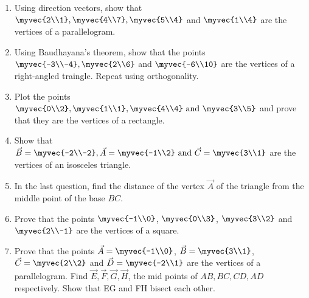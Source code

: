 \begin{enumerate}[label=\arabic*.,ref=\thesubsection.\theenumi]
\item Using direction vectors, show that  $\myvec{2\\1}, \myvec{4\\7}, \myvec{5\\4}$ and $\myvec{1\\4}$ are the vertices of a parallelogram.
\solution

\item Using Baudhayana's theorem, show that the points $\myvec{-3\\-4}, \myvec{2\\6}$ and $\myvec{-6\\10}$  are the vertices of a right-angled
traingle.  Repeat using orthogonality.
\solution

\item Plot the points $\myvec{0\\2},\myvec{1\\1},\myvec{4\\4}\text{ and }\myvec{3\\5}$ and prove that they are the vertices of a rectangle.
\item Show that $\vec{B}=\myvec{-2\\-2},\vec{A}=\myvec{-1\\2}\text{ and }\vec{C}=\myvec{3\\1}$ are the vertices of an isosceles triangle.
\\
\solution

\item In the last question, find the distance of the vertex $\vec{A}$ of the triangle from the middle point of the base $BC$.
\\
\solution

\item Prove that the points $\myvec{-1\\0}$, $\myvec{0\\3}$, $\myvec{3\\2}$ and $\myvec{2\\-1}$ are the vertices of a square.
\item Prove that the points $\vec{A}=\myvec{-1\\0}$, $\vec{B}=\myvec{3\\1}$, $\vec{C}=\myvec{2\\2}$  and $\vec{D}=\myvec{-2\\1}$ are the vertices of a parallelogram.  Find $\vec{E},\vec{F},\vec{G},\vec{H}$, the mid points of $AB, BC, CD, AD$ respectively.  Show that EG and FH bisect each other.
\\
\solution



\end{enumerate}
